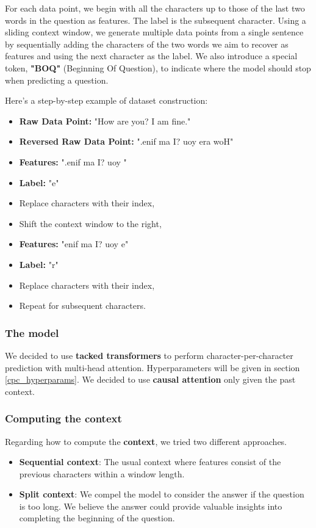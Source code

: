 \documentclass{article}
\begin{document}
For each data point, we begin with all the characters up to those of the last two words in the question as features. The label is the subsequent character. Using a sliding context window, we generate multiple data points from a single sentence by sequentially adding the characters of the two words we aim to recover as features and using the next character as the label. We also introduce a special token, \textbf{"BOQ"} (Beginning Of Question), to indicate where the model should stop when predicting a question.

Here's a step-by-step example of dataset construction:

\begin{itemize}
    \item \textbf{Raw Data Point:} "How are you? I am fine."
    \item \textbf{Reversed Raw Data Point:} ".enif ma I? uoy era woH"
    \item \textbf{Features:} ".enif ma I? uoy "
    \item \textbf{Label:} "e"
    \item Replace characters with their index,
    \item Shift the context window to the right,
    \item \textbf{Features:} "enif ma I? uoy e"
    \item \textbf{Label:} "r"
    \item Replace characters with their index,
    \item Repeat for subsequent characters.
\end{itemize}


\subsubsection{The model}
We decided to use \textbf{tacked transformers} to perform character-per-character prediction with multi-head attention. Hyperparameters will be given in section \ref{cpc_hyperparams}.
We decided to use \textbf{causal attention} only given the past context.

\subsubsection{Computing the context}

Regarding how to compute the \textbf{context}, we tried two different approaches. 

\begin{itemize}
    \item \textbf{Sequential context}: The usual context where features consist of the previous characters within a window length.
    \item \textbf{Split context}: We compel the model to consider the answer if the question is too long. We believe the answer could provide valuable insights into completing the beginning of the question.
\end{itemize}
\end{document}
